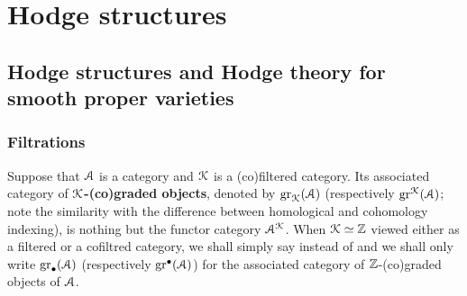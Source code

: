 \section{Hodge structures}
    \subsection{Hodge structures and Hodge theory for smooth proper varieties}
        \subsubsection{Filtrations}
            \begin{definition} \label{def: graded_objects}
                Suppose that $\mathcal{A}$ is a category and $\mathcal{K}$ is a (co)filtered category. Its associated category of \textbf{$\mathcal{K}$-(co)graded objects}, denoted by $\operatorname{gr}_{\mathcal{K}}(\mathcal{A})$ (respectively $\operatorname{gr}^{\mathcal{K}}(\mathcal{A})$; note the similarity with the difference between homological and cohomology indexing), is nothing but the functor category $\mathcal{A}^{\mathcal{K}}$. When $\mathcal{K} \simeq \mathbb{Z}$ viewed either as a filtered or a cofiltred category, we shall simply say  instead of  and we shall only write $\operatorname{gr}_{\bullet}(\mathcal{A})$ (respectively $\operatorname{gr}^{\bullet}(\mathcal{A})$) for the associated category of $\mathbb{Z}$-(co)graded objects of $\mathcal{A}$.
            \end{definition}
